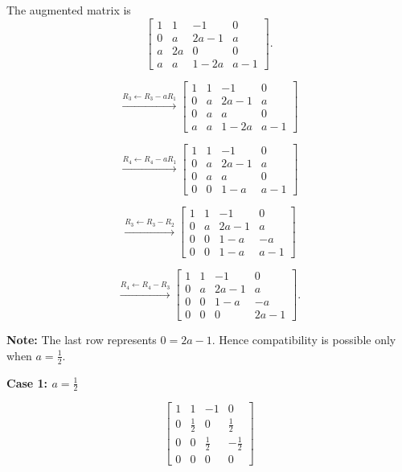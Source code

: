 
\begin{answer}
    The augmented matrix is
    $$
    \left[
    \begin{array}{ccc|c}
    1&1&-1&0\\
    0&a&2a-1&a\\
    a&2a&0&0\\
    a&a&1-2a&a-1
    \end{array}
    \right].
    $$

    $$
    \xrightarrow{R_3\leftarrow R_3-aR_1}
    \left[
    \begin{array}{ccc|c}
    1&1&-1&0\\
    0&a&2a-1&a\\
    0&a&a&0\\
    a&a&1-2a&a-1
    \end{array}
    \right]
    $$

    $$
    \xrightarrow{R_4\leftarrow R_4-aR_1}
    \left[
    \begin{array}{ccc|c}
    1&1&-1&0\\
    0&a&2a-1&a\\
    0&a&a&0\\
    0&0&1-a&a-1
    \end{array}
    \right]
    $$

    $$
    \xrightarrow{R_3\leftarrow R_3-R_2}
    \left[
    \begin{array}{ccc|c}
    1&1&-1&0\\
    0&a&2a-1&a\\
    0&0&1-a&-a\\
    0&0&1-a&a-1
    \end{array}
    \right]
    $$

    $$
    \xrightarrow{R_4\leftarrow R_4-R_3}
    \left[
    \begin{array}{ccc|c}
    1&1&-1&0\\
    0&a&2a-1&a\\
    0&0&1-a&-a\\
    0&0&0&2a-1
    \end{array}
    \right].
    $$

    {\color{red}
    \textbf{Note:} The last row represents
    $0=2a-1$. Hence compatibility is possible only when $a=\frac12$.}

    \textbf{Case 1: $a=\frac12$}

    $$
    \left[
    \begin{array}{ccc|c}
    1&1&-1&0\\
    0&\frac12&0&\frac12\\
    0&0&\frac12&-\frac12\\
    0&0&0&0
    \end{array}
    \right]
    $$


\end{answer}
